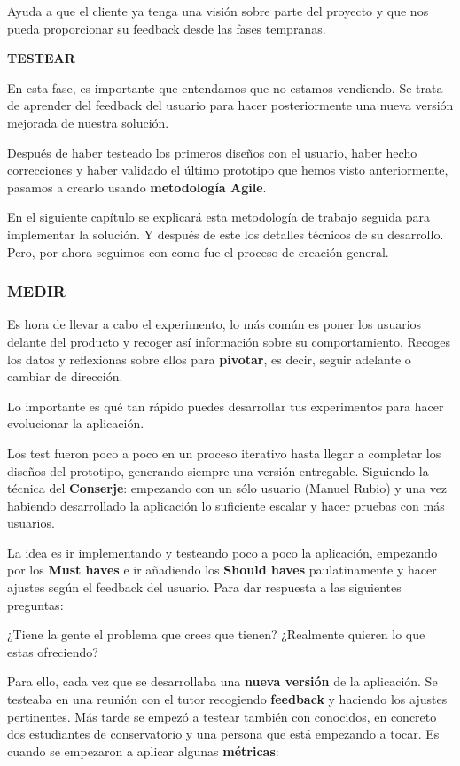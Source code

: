 \documentclass[12pt,twoside,titlepage]{report}
\begin{document}
Ayuda a que el cliente ya tenga una visión sobre parte del proyecto y que nos pueda proporcionar su feedback desde las fases tempranas.

\textbf{TESTEAR}

En esta fase, es importante que entendamos que no estamos vendiendo. Se trata de aprender del feedback del usuario para hacer posteriormente una nueva versión mejorada de nuestra solución.

Después de haber testeado los primeros diseños con el usuario, haber hecho correcciones y haber validado el último prototipo que hemos visto anteriormente, pasamos a crearlo usando \textbf{metodología Agile}.

En el siguiente capítulo se explicará esta metodología de trabajo seguida para implementar la solución. Y después de este los detalles técnicos de su desarrollo. Pero, por ahora seguimos con como fue el proceso de creación general.

\subsubsection{MEDIR}

Es hora de llevar a cabo el experimento, lo más común es poner los usuarios delante del producto y recoger así información sobre su comportamiento. Recoges los datos y reflexionas sobre ellos para \textbf{pivotar}, es decir, seguir adelante o cambiar de dirección. 

Lo importante es qué tan rápido puedes desarrollar tus experimentos para hacer evolucionar la aplicación. 

Los test fueron poco a poco en un proceso iterativo hasta llegar a completar los diseños del prototipo, generando siempre una versión entregable. Siguiendo la técnica del \textbf{Conserje}: empezando con un sólo usuario (Manuel Rubio) y una vez habiendo desarrollado la aplicación lo suficiente escalar y hacer pruebas con más usuarios.

La idea es ir implementando y testeando poco a poco la aplicación, empezando por los \textbf{Must haves} e ir añadiendo los \textbf{Should haves} paulatinamente y hacer ajustes según el feedback del usuario. Para dar respuesta a las siguientes preguntas:

¿Tiene la gente el problema que crees que tienen? ¿Realmente quieren lo que estas ofreciendo?

Para ello, cada vez que se desarrollaba una \textbf{nueva versión} de la aplicación. Se testeaba en una reunión con el tutor recogiendo \textbf{feedback} y haciendo los ajustes pertinentes. Más tarde se empezó a testear también con conocidos, en concreto dos estudiantes de conservatorio y una persona que está empezando a tocar. Es cuando se empezaron a aplicar algunas \textbf{métricas}:
\end{document}
